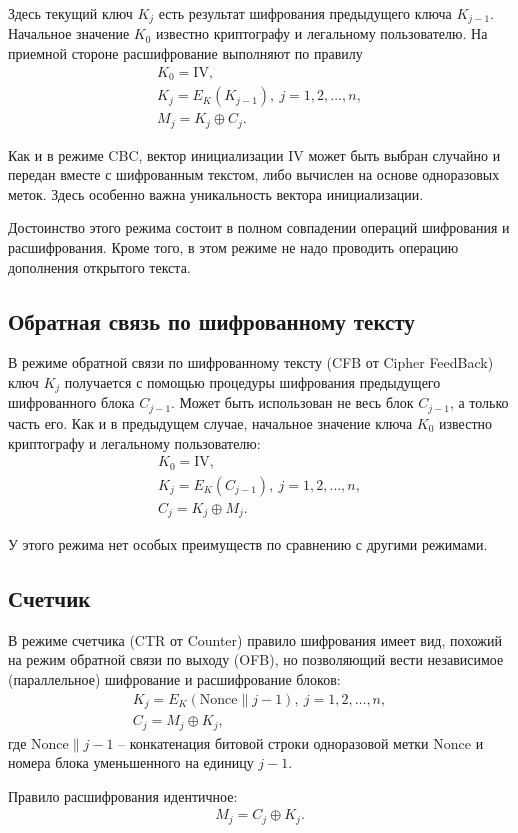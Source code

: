 Здесь текущий ключ $K_j$ есть результат шифрования предыдущего ключа $K_{j-1}$. Начальное значение $K_0$ известно криптографу и легальному пользователю. На приемной стороне расшифрование выполняют по правилу
\[ \begin{array}{l}
    K_0 = \textrm{IV}, \\
    K_j = E_K(K_{j-1}), ~ j = 1, 2, \dots, n, \\
    M_j = K_j \oplus C_j.
\end{array} \]

Как и в режиме CBC, вектор инициализации $\textrm{IV}$ может быть выбран случайно и передан вместе с шифрованным текстом, либо вычислен на основе одноразовых меток. Здесь особенно важна уникальность вектора инициализации.

Достоинство этого режима состоит в полном совпадении операций шифрования и расшифрования. Кроме того, в этом режиме не надо проводить операцию дополнения открытого текста.


\subsection{Обратная связь по шифрованному тексту}

В режиме обратной связи по шифрованному тексту (CFB от Cipher FeedBack) ключ $K_j$ получается с помощью процедуры шифрования предыдущего шифрованного блока $C_{j-1}$. Может быть использован не весь блок $C_{j-1}$, а только часть его. Как и в предыдущем случае, начальное значение ключа $K_0$ известно криптографу и легальному пользователю:
\[ \begin{array}{l}
    K_0 = \textrm{IV}, \\
    K_j = E_K(C_{j-1}), ~ j = 1, 2, \dots, n,\\
    C_j = K_j \oplus M_j.
\end{array} \]

У этого режима нет особых преимуществ по сравнению с другими режимами.


\subsection{Счетчик}

В режиме счетчика (CTR от Counter) правило шифрования имеет вид, похожий на режим обратной связи по выходу (OFB), но позволяющий вести независимое (параллельное) шифрование и расшифрование блоков:
\[ \begin{array}{l}
    K_j = E_K(\textrm{Nonce} \| j - 1), ~ j = 1, 2, \dots, n, \\
    C_j = M_j \oplus K_j,
\end{array} \]
где $\textrm{Nonce} \| j - 1$ -- конкатенация битовой строки одноразовой метки $\textrm{Nonce}$ и номера блока уменьшенного на единицу $j-1$.

Правило расшифрования идентичное:
\[ \begin{array}{l}
    M_j = C_j \oplus K_j. \\
\end{array} \]
